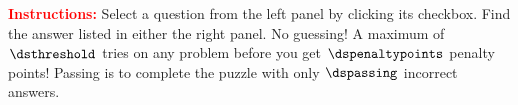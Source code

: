 \documentclass{article}
\begin{document}
\maketitle





\def\answidth{1.7in}
\def\queswidth{2in}
\def\ublength{.5in}
\def\commondepth{6in+2\baselineskip}

\ifeqforpaper\vspace*{-1in}\fi

{\bfseries\noindent
{}
}



\textcolor{red}{\textbf{Instructions:}} Select a question from the
left panel by clicking its checkbox. Find the answer listed in
either the right panel.  No guessing! A maximum of $\dsthreshold$
tries on any problem before you get $\dspenaltypoints$ penalty
points!  Passing is to complete the puzzle with only $\dspassing$
incorrect answers.
\end{document}
